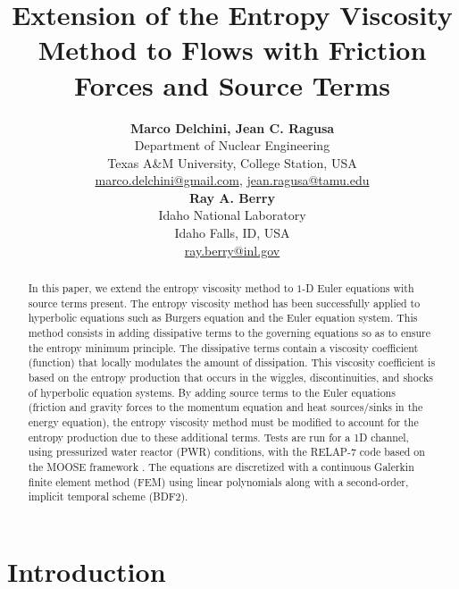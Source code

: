 \documentclass[12pt]{article}
\title{Extension of the Entropy Viscosity Method to Flows with Friction Forces and Source Terms}
\author{ 
  \textbf{Marco Delchini, Jean C. Ragusa} \\
  Department of Nuclear Engineering \\
  Texas A\&M University, College Station, USA\\
  \href{mailto:marco.delchini@gmail.com}{marco.delchini@gmail.com}, 
  \href{mailto:jean.ragusa@tamu.edu}{jean.ragusa@tamu.edu}\\
  \textbf{Ray A. Berry} \\
  Idaho National Laboratory\\
  Idaho Falls, ID, USA\\
  \href{mailto:ray.berry@inl.gov}{ray.berry@inl.gov}
}
\begin{document}


\maketitle

\begin{abstract}
In this paper, we extend the entropy viscosity method \cite{valentin, jlg1, jlg2} to $1$-D Euler equations with source terms present. 
The entropy viscosity method has been successfully applied to hyperbolic equations such as Burgers equation and the Euler
equation system. This method consists in adding dissipative terms to the governing equations so as to ensure the entropy minimum principle. The dissipative terms contain a viscosity coefficient (function) that locally modulates the amount of dissipation.
This viscosity coefficient is based on the entropy production that occurs in the wiggles, discontinuities, and shocks of hyperbolic equation systems.
By adding source terms to the Euler equations (friction and gravity forces to the momentum equation and heat sources/sinks in the energy equation), the entropy viscosity method must be modified to account for the entropy production due to these additional terms. Tests are run for a 1D channel, using pressurized water reactor (PWR) conditions, with the RELAP-7 code \cite{relap7} based on the MOOSE framework \cite{Moose}. The equations are discretized with a continuous Galerkin finite element method (FEM) using linear polynomials along with a second-order, implicit temporal scheme (BDF2).
\end{abstract}


%
\section{Introduction}
\label{sect::intro}
\end{document}
